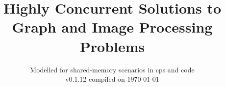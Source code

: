 \documentclass[newzealand,10pt,partial]{aucklandthesis}
\theoremstyle{plain}
\begin{document}

%
%
%

\title{Highly Concurrent Solutions to Graph and Image Processing Problems}
\subtitle{Modelled for shared-memory scenarios in \gls{cps} and code \\ {\small v0.1.12 compiled on \today}}

\maketitle




\cleardoublepage\tableofcontents
\cleardoublepage\listoffigures
\cleardoublepage\listoftables
\cleardoublepage\listofcprulesetfloats
\cleardoublepage\listofcpobjectsfloats
\cleardoublepage\listoffixmes


%
%
%
%

\mainmatter
\end{document}
